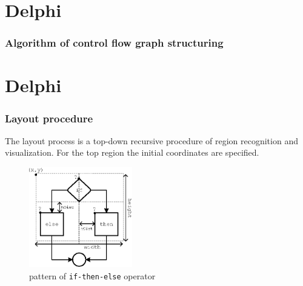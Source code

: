 \documentclass{beamer}
\begin{document}

\section{Delphi}
\begin{frame}
\frametitle{Algorithm of control flow graph structuring}
\small{%
\begin{algorithm}[H]
\SetAlgoLined %
\end{algorithm}%
}
\end{frame}


\section{Delphi}
\begin{frame}
\frametitle{Layout procedure}

The layout process is a top-down recursive procedure of region recognition and visualization.  For the top region the initial coordinates are specified.

\begin{figure}[htbp]
	\centering
		\includegraphics[width=0.4\textwidth]{Pic/IfThenElse.eps}
	\caption{pattern of \texttt{if-then-else} operator}
	\label{fig:IfThenElse}
\end{figure}

\end{frame}
\end{document}
